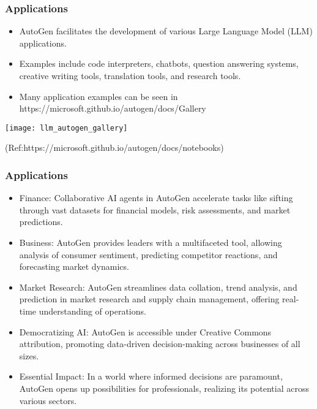   
\begin{frame}[fragile]\frametitle{Applications}
  \begin{itemize}
    \item AutoGen facilitates the development of various Large Language Model (LLM) applications.
    \item Examples include code interpreters, chatbots, question answering systems, creative writing tools, translation tools, and research tools.
	\item Many application examples can be seen in https://microsoft.github.io/autogen/docs/Gallery
  \end{itemize}
  
	\begin{center}
	\texttt{[image: llm\_autogen\_gallery]}
	\end{center}

	
{\tiny (Ref:https://microsoft.github.io/autogen/docs/notebooks)}
  
  
\end{frame}

\begin{frame}[fragile]\frametitle{Applications}
  \begin{itemize}
    \item Finance: Collaborative AI agents in AutoGen accelerate tasks like sifting through vast datasets for financial models, risk assessments, and market predictions.
    \item Business: AutoGen provides leaders with a multifaceted tool, allowing analysis of consumer sentiment, predicting competitor reactions, and forecasting market dynamics.
    \item Market Research: AutoGen streamlines data collation, trend analysis, and prediction in market research and supply chain management, offering real-time understanding of operations.
    \item Democratizing AI: AutoGen is accessible under Creative Commons attribution, promoting data-driven decision-making across businesses of all sizes.
    \item Essential Impact: In a world where informed decisions are paramount, AutoGen opens up possibilities for professionals, realizing its potential across various sectors.
  \end{itemize}
\end{frame}

